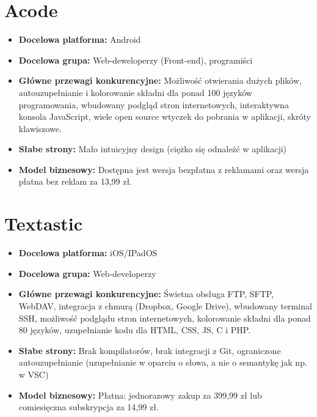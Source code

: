 \newpage
\section{Acode}
\begin{itemize}
    
    \item \textbf{Docelowa platforma:} Android 
    \item \textbf{Docelowa grupa:} Web-deweloperzy (Front-end), programiści 
    \item \textbf{Główne przewagi konkurencyjne:} Możliwość otwierania dużych plików, autouzupełnianie i kolorowanie składni dla ponad 100 języków programowania, wbudowany podgląd stron internetowych, interaktywna konsola JavaScript, wiele open source wtyczek do pobrania w aplikacji, skróty klawiszowe. 
    \item \textbf{Słabe strony:} Mało intuicyjny design (ciężko się odnaleźć w aplikacji)
    \item \textbf{Model biznesowy:} Dostępna jest wersja bezpłatna z reklamami oraz wersja płatna bez reklam za 13,99 zł. 
\end{itemize}

\newpage
\section{Textastic}
\begin{itemize}
    \item \textbf{Docelowa platforma:} iOS/IPadOS 
    \item \textbf{Docelowa grupa:} Web-developerzy 
    \item \textbf{Główne przewagi konkurencyjne:} Świetna obsługa FTP, SFTP, WebDAV, integracja z chmurą (Dropbox, Google Drive), wbudowany terminal SSH, możliwość podglądu stron internetowych, kolorowanie składni dla ponad 80 języków, uzupełnianie kodu dla HTML, CSS, JS, C i PHP.
    \item \textbf{Słabe strony:} Brak kompilatorów, brak integracji z Git, ograniczone autouzupełnianie (uzupełnianie w oparciu o słowa, a nie o semantykę jak np. w VSC) 
    \item \textbf{Model biznesowy:} Płatna: jednorazowy zakup za 399,99 zł lub comiesięczna subskrypcja za 14,99 zł. 
\end{itemize}

